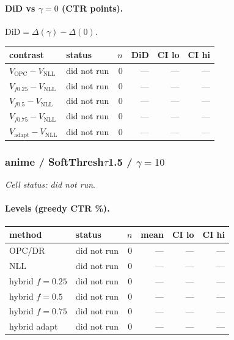 \documentclass[10pt,a4paper]{article}
\begin{document}
\paragraph{DiD vs $\gamma=0$ (CTR points).} $\mathrm{DiD}=\Delta(\gamma)-\Delta(0)$.
{\centering\small\begin{tabular}{llrrrr}
\toprule contrast & status & $n$ & DiD & CI lo & CI hi \\
\midrule
$V_{\mathrm{OPC}}-V_{\mathrm{NLL}}$ & did not run & 0 & --- & --- & --- \\
$V_{f0.25}-V_{\mathrm{NLL}}$ & did not run & 0 & --- & --- & --- \\
$V_{f0.5}-V_{\mathrm{NLL}}$ & did not run & 0 & --- & --- & --- \\
$V_{f0.75}-V_{\mathrm{NLL}}$ & did not run & 0 & --- & --- & --- \\
$V_{\mathrm{adapt}}-V_{\mathrm{NLL}}$ & did not run & 0 & --- & --- & --- \\
\bottomrule\end{tabular}\par}
\bigskip
\subsubsection{anime / SoftThresh$\tau$1.5 / $\gamma=10$}
\emph{Cell status: did not run}.
\paragraph{Levels (greedy CTR \%).}
{\centering\small\begin{tabular}{llrrrr}
\toprule method & status & $n$ & mean & CI lo & CI hi \\
\midrule
OPC/DR & did not run & 0 & --- & --- & --- \\
NLL & did not run & 0 & --- & --- & --- \\
hybrid $f{=}0.25$ & did not run & 0 & --- & --- & --- \\
hybrid $f{=}0.5$ & did not run & 0 & --- & --- & --- \\
hybrid $f{=}0.75$ & did not run & 0 & --- & --- & --- \\
hybrid adapt & did not run & 0 & --- & --- & --- \\
\bottomrule\end{tabular}\par}
\end{document}
